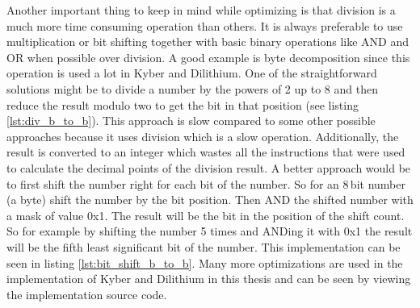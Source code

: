 Another important thing to keep in mind while optimizing is that division is a much more time consuming operation than others. It is always preferable to use multiplication or bit shifting together with basic binary operations like AND and OR when possible over division. A good example is byte decomposition since this operation is used a lot in Kyber and Dilithium. One of the straightforward solutions might be to divide a number by the powers of 2 up to 8 and then reduce the result modulo two to get the bit in that position (see listing \ref{lst:div_b_to_b}).
\noindent This approach is slow compared to some other possible approaches because it uses division which is a slow operation. Additionally, the result is converted to an integer which wastes all the instructions that were used to calculate the decimal points of the division result. A better approach would be to first shift the number right for each bit of the number. So for an 8\,bit number (a byte) shift the number by the bit position. Then AND the shifted number with a mask of value 0x1. The result will be the bit in the position of the shift count. So for example by shifting the number 5 times and ANDing it with 0x1 the result will be the fifth least significant bit of the number. This implementation can be seen in listing \ref{lst:bit_shift_b_to_b}. Many more optimizations are used in the implementation of Kyber and Dilithium in this thesis and can be seen by viewing the implementation source code.
